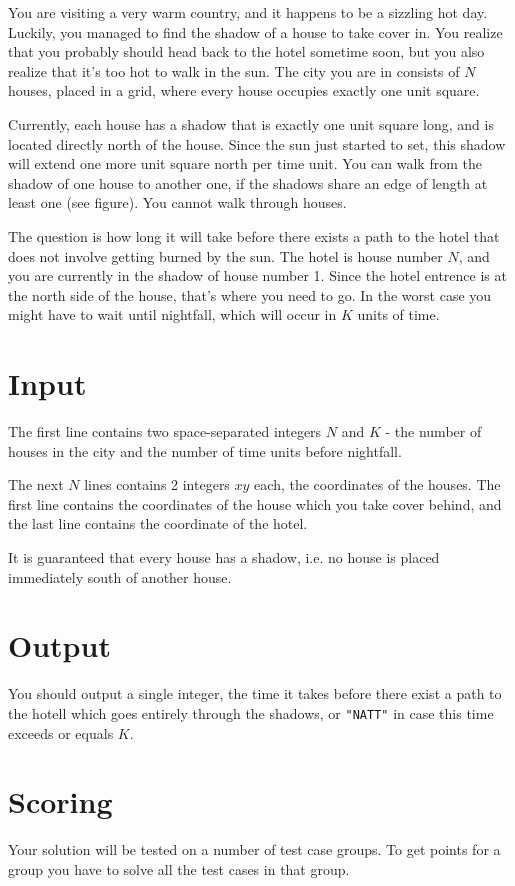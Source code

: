
You are visiting a very warm country, and it happens to be a sizzling hot day. Luckily, you managed to find the shadow of a house to take cover in. You realize that you probably should head back to the hotel sometime soon, but you also realize that it's too hot to walk in the sun. The city you are in consists of $N$ houses, placed in a grid, where every house occupies exactly one unit square.

Currently, each house has a shadow that is exactly one unit square long, and is located directly north of the house. Since the sun just started to set, this shadow will extend one more unit square north per time unit. You can walk from the shadow of one house to another one, if the shadows share an edge of length at least one (see figure). You cannot walk through houses.

The question is how long it will take before there exists a path to the hotel that does not involve getting burned by the sun. The hotel is house number $N$, and you are currently in the shadow of house number 1. Since the hotel entrence is at the north side of the house, that's where you need to go. In the worst case you might have to wait until nightfall, which will occur in $K$ units of time.

\section*{Input}
The first line contains two space-separated integers $N$ and $K$ - the number of houses in the city and the number of time units before nightfall.

The next $N$ lines contains 2 integers $x y$ each, the coordinates of the houses. The first line contains the coordinates of the house which you take cover behind, and the last line contains the coordinate of the hotel.

It is guaranteed that every house has a shadow, i.e. no house is placed immediately south of another house.

\section*{Output}
You should output a single integer, the time it takes before there exist a path to the hotell which goes entirely through the shadows, or \texttt{"NATT"} in case this time exceeds or equals $K$.

\section*{Scoring}
Your solution will be tested on a number of test case groups. To get points for a group
you have to solve all the test cases in that group.

